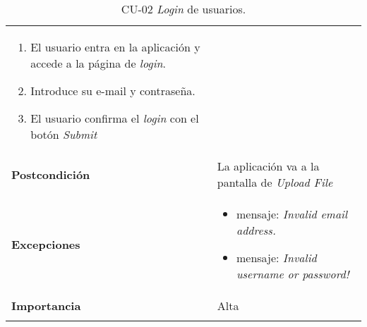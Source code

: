 \begin{longtable}[H]{@{}ll@{}}
\begin{minipage}[t]{0.71\columnwidth}
\begin{enumerate}
\def\labelenumi{\arabic{enumi}.}
\tightlist
\item
  El usuario entra en la aplicación y accede a la página de \emph{login}.
\item
  Introduce su e-mail y contraseña.
\item
  El usuario confirma el \emph{login} con el botón \emph{Submit}
\end{enumerate}\strut
\end{minipage}\tabularnewline
\begin{minipage}[t]{0.23\columnwidth}\raggedright\strut
\textbf{Postcondición}\strut
\end{minipage} & \begin{minipage}[t]{0.71\columnwidth}\raggedright\strut
La aplicación va a la pantalla de \emph{Upload File}
\end{minipage}\tabularnewline
\begin{minipage}[t]{0.23\columnwidth}\raggedright\strut
\textbf{Excepciones}\strut
\end{minipage} & \begin{minipage}[t]{0.71\columnwidth}\raggedright\strut
\begin{itemize}
\tightlist
\item
  mensaje: \textit{Invalid email address.}
\item
  mensaje: \textit{Invalid username or password!}
  
\end{itemize}\strut
\end{minipage}\tabularnewline
\begin{minipage}[t]{0.23\columnwidth}\raggedright\strut
\textbf{Importancia}\strut
\end{minipage} & \begin{minipage}[t]{0.71\columnwidth}\raggedright\strut
Alta\strut
\end{minipage}\tabularnewline
\bottomrule
\caption{CU-02 \emph{Login} de usuarios.}
\end{longtable}
\strut

